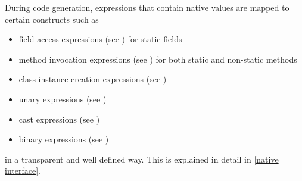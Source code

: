 During code generation, expressions that contain native values  are mapped to certain \java{} constructs such as

\begin{itemize}
\item field access expressions (see \cite[section 15.11]{langspec3}) for static fields
\item method invocation expressions (see \cite[section 15.12]{langspec3}) for both static and non-static methods
\item class instance creation expressions (see \cite[section 15.9]{langspec3})
\item unary expressions (see \cite[section 15.15]{langspec3})
\item cast expressions (see \cite[section 15.16]{langspec3})
\item binary expressions (see \cite[section 15.17 to 15.24]{langspec3})
\end{itemize}

in a transparent and well defined way. This is explained in detail in \autoref{native interface}.
